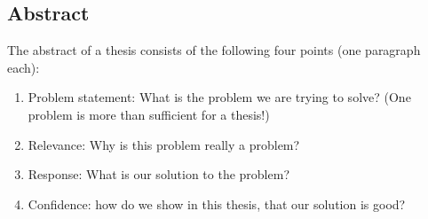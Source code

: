 \documentclass{article}
\begin{document}
\subsection{Abstract}

The abstract of a thesis consists of the following four points (one paragraph each):

\begin{enumerate}
	\item Problem statement: What is the problem we are trying to solve? (One problem is more than sufficient for a thesis!)
	\item Relevance: Why is this problem really a problem?
	\item Response: What is our solution to the problem?
	\item Confidence: how do we show in this thesis, that our solution is good?
\end{enumerate}
\end{document}
